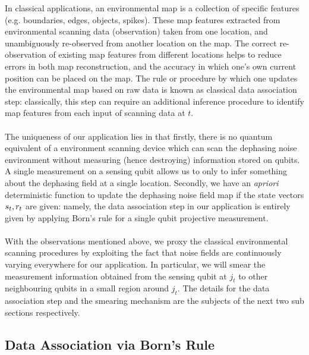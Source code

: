 In classical applications,  an environmental map is a collection of specific features (e.g. boundaries, edges, objects, spikes). These map features extracted from environmental scanning data (observation) taken from one location, and unambiguously re-observed from another location on the map. The correct re-observation of existing map features from different locations helps to reduce errors in both map reconstruction, and the accuracy in which one's own current position can be placed on the map. The rule or procedure by which one updates the environmental map based on raw data is known as classical data association step: classically, this step can require an additional inference procedure to identify map features from each input of scanning data at $t$.\\
\\
The uniqueness of our application lies in that firstly, there is no quantum equivalent of a environment scanning device which can scan the dephasing noise environment without measuring (hence destroying) information stored on qubits. A single measurement on a sensing qubit allows us to only to infer something about the dephasing field at a single location. Secondly, we have an \textit{apriori}  deterministic function to update the dephasing noise field map if the state vectors $s_{ t}, r_{ t}$ are given: namely, the data association step in our application is entirely given by applying Born's rule for a single qubit projective measurement. \\
\\
With the observations mentioned above, we proxy the classical environmental scanning procedures by exploiting the fact that noise fields are continuously varying everywhere for our application. In particular,  we will smear the measurement information obtained from the sensing qubit at $j_t$ to other neighbouring qubits in a small region around $j_t$. The details for the data association step and the smearing mechanism are the subjects of the next two sub sections respectively. 

\subsection{Data Association via Born's Rule}


